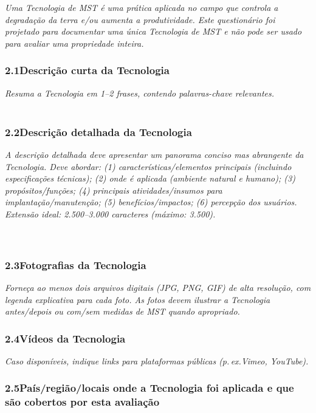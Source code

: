 \textit{Uma Tecnologia de MST é uma prática aplicada no campo que controla a degradação da terra e/ou aumenta a produtividade. Este questionário foi projetado para documentar uma única Tecnologia de MST e não pode ser usado para avaliar uma propriedade inteira.}

\subsubsection*{2.1\quad Descrição curta da Tecnologia}
\textit{Resuma a Tecnologia em 1--2 frases, contendo palavras-chave relevantes.}\\[4pt]
\dotfill\\[2pt]\dotfill

\subsubsection*{2.2\quad Descrição detalhada da Tecnologia}
\textit{A descrição detalhada deve apresentar um panorama conciso mas abrangente da Tecnologia. Deve abordar: (1) características/elementos principais (incluindo especificações técnicas); (2) onde é aplicada (ambiente natural e humano); (3) propósitos/funções; (4) principais atividades/insumos para implantação/manutenção; (5) benefícios/impactos; (6) percepção dos usuários. Extensão ideal: 2.500--3.000 caracteres (máximo: 3.500).}\\[4pt]
\dotfill\\[2pt]\dotfill\\[2pt]\dotfill

\subsubsection*{2.3\quad Fotografias da Tecnologia}
\textit{Forneça ao menos dois arquivos digitais (JPG, PNG, GIF) de alta resolução, com legenda explicativa para cada foto. As fotos devem ilustrar a Tecnologia antes/depois ou com/sem medidas de MST quando apropriado.}

\subsubsection*{2.4\quad Vídeos da Tecnologia}
\textit{Caso disponíveis, indique links para plataformas públicas (p.\,ex.\@ Vimeo, YouTube).}

\subsubsection*{2.5\quad País/região/locais onde a Tecnologia foi aplicada e que são cobertos por esta avaliação}

